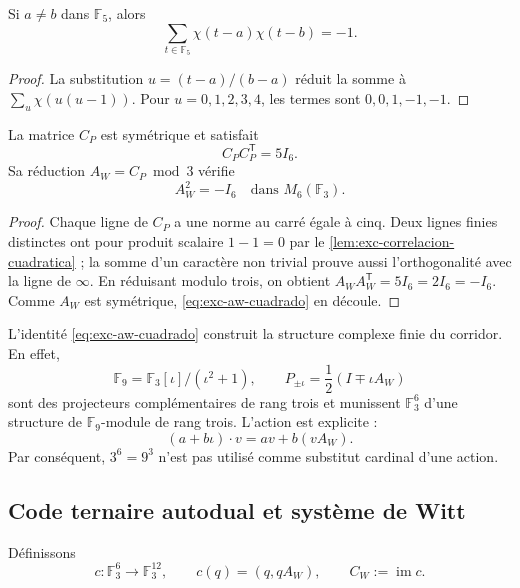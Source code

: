 \begin{lemma}
\label{lem:exc-correlacion-cuadratica}
Si \(a\ne b\) dans \(\mathbb F_5\), alors
\[
 \sum_{t\in\mathbb F_5}\chi(t-a)\chi(t-b)=-1.
\]
\end{lemma}

\begin{proof}
La substitution \(u=(t-a)/(b-a)\) réduit la somme à
\(\sum_u\chi(u(u-1))\). Pour \(u=0,1,2,3,4\), les termes sont
\(0,0,1,-1,-1\).
\end{proof}

\begin{proposition}
\label{prop:exc-paley-witt}
La matrice \(C_P\) est symétrique et satisfait
\[
 C_PC_P^{\mathsf T}=5I_6.
\]
Sa réduction \(A_W=C_P\bmod3\) vérifie
\begin{equation}
 \boxed{A_W^2=-I_6\quad\text{dans }M_6(\mathbb F_3).}
 \label{eq:exc-aw-cuadrado}
\end{equation}
\end{proposition}

\begin{proof}
Chaque ligne de \(C_P\) a une norme au carré égale à cinq. Deux lignes finies
distinctes ont pour produit scalaire \(1-1=0\) par le
\cref{lem:exc-correlacion-cuadratica} ; la somme d'un caractère non trivial
prouve aussi l'orthogonalité avec la ligne de \(\infty\). En réduisant modulo
trois, on obtient
\(A_WA_W^{\mathsf T}=5I_6=2I_6=-I_6\). Comme \(A_W\) est symétrique,
\eqref{eq:exc-aw-cuadrado} en découle.
\end{proof}

L'identité \eqref{eq:exc-aw-cuadrado} construit la structure complexe
finie du corridor. En effet,
\[
 \mathbb F_9=\mathbb F_3[\iota]/(\iota^2+1),
 \qquad
 P_{\pm\iota}=\frac12(I\mp\iota A_W)
\]
sont des projecteurs complémentaires de rang trois et munissent
\(\mathbb F_3^6\) d'une structure de \(\mathbb F_9\)-module de rang trois.
L'action est explicite :
\begin{equation}
 (a+b\iota)\cdot v=av+b(vA_W).
 \label{eq:exc-accion-f9}
\end{equation}
Par conséquent, \(3^6=9^3\) n'est pas utilisé comme substitut cardinal d'une action.

\subsection{Code ternaire autodual et système de Witt}

Définissons
\begin{equation}
 c:\mathbb F_3^6\longrightarrow\mathbb F_3^{12},
 \qquad c(q)=(q,qA_W),
 \qquad C_W:=\operatorname{im}c.
 \label{eq:exc-codigo-grafico}
\end{equation}

